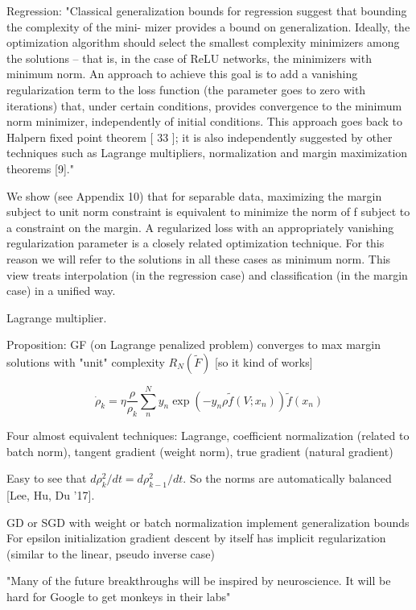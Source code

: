 \documentclass[english]{article}
\begin{document}
Regression: 
"Classical generalization bounds for regression suggest that bounding the complexity of the mini-
mizer provides a bound on generalization. Ideally, the optimization algorithm should select the
smallest complexity minimizers among the solutions – that is, in the case of ReLU networks,
the minimizers with minimum norm. An approach to achieve this goal is to add a vanishing
regularization term to the loss function (the parameter goes to zero with iterations) that, under
certain conditions, provides convergence to the minimum norm minimizer, independently of
initial conditions. This approach goes back to Halpern fixed point theorem [ 33 ]; it is also
independently suggested by other techniques such as Lagrange multipliers, normalization and
margin maximization theorems [9]."

We show (see Appendix 10) that for separable data, maximizing the margin subject to unit
norm constraint is equivalent to minimize the norm of f subject to a constraint on the margin.
A regularized loss with an appropriately vanishing regularization parameter is a closely related
optimization technique. For this reason we will refer to the solutions in all these cases as minimum
norm. This view treats interpolation (in the regression case) and classification (in the margin
case) in a unified way.

\item Lagrange multiplier. 

Proposition: GF (on Lagrange penalized problem) converges to max margin solutions with "unit" complexity $R_N(\tilde F)$ [so it kind of works]

$$
\dot \rho_k 
= 
\eta
\frac{\rho}{\rho_k}
\sum_n^N y_n\exp(-y_n\rho \tilde f(V;x_n))
\tilde f(x_n)
$$

Four almost equivalent techniques: Lagrange, coefficient normalization (related to batch norm), tangent gradient (weight norm), true gradient (natural gradient)

Easy to see that $d\rho_k^2/dt = d\rho_{k-1}^2/dt$. So the norms are automatically balanced [Lee, Hu, Du '17]. 

GD or SGD with weight or batch normalization implement generalization bounds For epsilon initialization gradient descent by itself has implicit regularization (similar to the linear, pseudo inverse case)

"Many of the future breakthroughs will be inspired by neuroscience. It will be hard for Google to get monkeys in their labs"

\eenum
\end{document}
